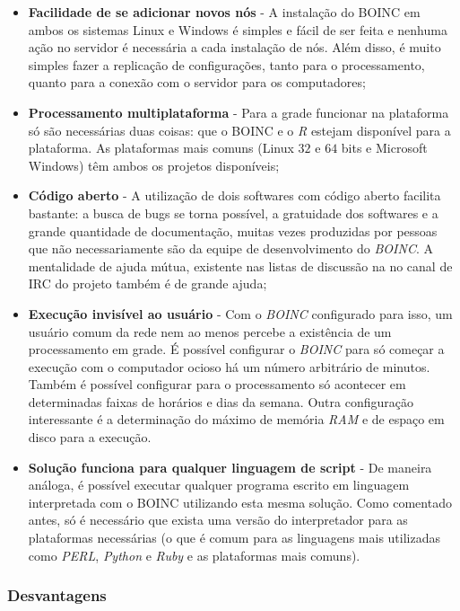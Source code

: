 \begin{itemize}
  \item \textbf{Facilidade de se adicionar novos nós} - A instalação do BOINC em ambos os sistemas Linux e Windows é simples
e fácil de ser feita e nenhuma ação no servidor é necessária a cada instalação de nós. Além disso, é muito simples fazer
a replicação de configurações, tanto para o processamento, quanto para a conexão com o servidor para os computadores;
  \item \textbf{Processamento multiplataforma} - Para a grade funcionar na plataforma só são necessárias duas coisas: 
que o BOINC e o \emph{R} estejam disponível para a plataforma. As plataformas mais comuns 
(Linux $32$ e $64$ bits e Microsoft Windows) têm ambos os projetos disponíveis;
  \item \textbf{Código aberto} - A utilização de dois softwares com código aberto facilita bastante: a 
busca de bugs se torna possível, a gratuidade dos softwares e a grande quantidade de documentação, muitas vezes produzidas por
pessoas que não necessariamente são da equipe de desenvolvimento do \emph{BOINC}. A mentalidade de ajuda mútua, existente nas
listas de discussão na no canal de IRC do projeto também é de grande ajuda; 
  \item \textbf{Execução invisível ao usuário} - Com o \emph{BOINC} configurado para isso, um usuário comum da rede nem ao menos 
percebe a existência de um processamento em grade. É possível configurar o \emph{BOINC} para só começar a execução com o computador ocioso
há um número arbitrário de minutos. Também é possível configurar para o processamento só acontecer em determinadas 
faixas de horários e dias da semana. Outra configuração interessante é a determinação do máximo de memória 
\emph{RAM} e de espaço em disco para a execução. 
  \item \textbf{Solução funciona para qualquer linguagem de script} - De maneira análoga, é possível executar qualquer programa escrito em 
linguagem interpretada com o BOINC utilizando esta mesma solução. Como comentado antes, só é necessário que exista uma versão do interpretador
para as plataformas necessárias (o que é comum para as linguagens mais utilizadas como \emph{PERL}, \emph{Python} e 
\emph{Ruby} e as plataformas mais comuns). 

\end{itemize}

\subsubsection{Desvantagens}

